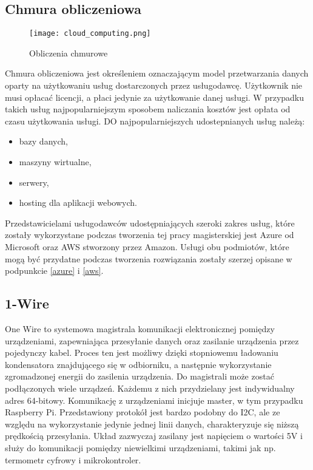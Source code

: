 \subsection{Chmura obliczeniowa}
\begin{figure}[H]
	\centering
	\texttt{[image: cloud\_computing.png]}
	\caption{Obliczenia chmurowe}
	\label{fig:chmura_obliczeniowa}
\end{figure}
Chmura obliczeniowa jest określeniem oznaczającym model przetwarzania danych oparty na użytkowaniu usług dostarczonych przez usługodawcę. Użytkownik nie musi opłacać licencji, a płaci jedynie za użytkowanie danej usługi. W przypadku takich usług najpopularniejszym sposobem naliczania kosztów jest opłata od czasu użytkowania usługi.
DO najpopularniejszych udostepnianych usług należą:
\begin{itemize}
\item bazy danych,
\item maszyny wirtualne,
\item serwery,
\item hosting dla aplikacji webowych.
\end{itemize}
Przedstawicielami usługodawców udostępniających szeroki zakres usług, które zostały wykorzystane podczas tworzenia tej pracy magisterskiej jest Azure od Microsoft oraz AWS stworzony przez Amazon. Usługi obu podmiotów, które mogą być przydatne podczas tworzenia rozwiązania zostały szerzej opisane w podpunkcie \ref{azure} i \ref{aws}.
\subsection{1-Wire} \label{1wire}
One Wire to systemowa magistrala komunikacji elektronicznej pomiędzy urządzeniami, zapewniająca przesyłanie danych oraz zasilanie urządzenia przez pojedynczy kabel. Proces ten jest możliwy dzięki stopniowemu ładowaniu kondensatora znajdującego się w odbiorniku, a następnie wykorzystanie zgromadzonej energii do zasilenia urządzenia. Do magistrali może zostać podłączonych wiele urządzeń. Każdemu z nich przydzielany jest indywidualny adres 64-bitowy. Komunikację z urządzeniami inicjuje master, w tym przypadku Raspberry Pi.
Przedstawiony protokół jest bardzo podobny do I2C, ale ze względu na wykorzystanie jedynie jednej linii danych, charakteryzuje się niższą prędkością przesyłania. Układ zazwyczaj zasilany jest napięciem o wartości 5V i służy do komunikacji pomiędzy niewielkimi urządzeniami, takimi jak np. termometr cyfrowy i mikrokontroler.

